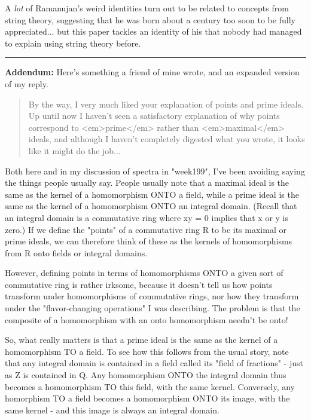 A \emph{lot} of 
Ramanujan's weird identities turn out to be related to concepts
from string theory, suggesting that he was born about a century too soon
to be fully appreciated... but this paper tackles an identity of his that
nobody had managed to explain using string theory before.

\par\noindent\rule{\textwidth}{0.4pt}
\textbf{Addendum:} 
Here's something a friend of mine wrote, and an expanded version
of my reply.

\begin{quote}
By the way, I very much liked your explanation of points and prime
ideals.  Up until now I haven't seen a satisfactory explanation of why
points correspond to <em>prime</em> rather than <em>maximal</em> ideals, and
although I haven't completely digested what you wrote, it looks
like it might do the job...
\end{quote}
    

Both here and in my discussion of spectra in "week199", I've been
avoiding saying the things people usually say.   People usually note
that a maximal ideal is the same as the kernel of a homomorphism 
ONTO a field, while a prime ideal is the same as the kernel of a 
homomorphism ONTO an integral domain.   (Recall that an integral 
domain is a commutative ring where xy = 0 implies that x or y is 
zero.)   If we define the "points" of a commutative ring R to be 
its maximal or prime ideals, we can therefore think of these as 
the kernels of homomorphisms from R onto fields or integral domains.  

However, defining points in terms of homomorphisms ONTO a given 
sort of commutative ring is rather irksome, because it doesn't 
tell us how points transform under homomorphisms of commutative 
rings, nor how they transform under the "flavor-changing operations" 
I was describing.  The problem is that the composite of a homomorphism 
with an onto homomorphism needn't be onto!

So, what really matters is that a prime ideal is the same as the 
kernel of a homomorphism TO a field.  To see how this follows from 
the usual story, note that any integral domain is contained in a 
field called its "field of fractions" - just as Z is contained in Q.  
Any homomorphism ONTO the integral domain thus becomes a homomorphism 
TO this field, with the same kernel.  Conversely, any homorphism TO 
a field becomes a homomorphism ONTO its image, with the same kernel - 
and this image is always an integral domain.

